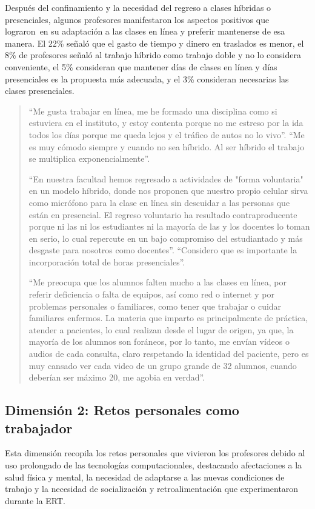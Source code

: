 \documentclass[spanish]{textolivre}
\begin{document}
Después del confinamiento y la necesidad del regreso a clases híbridas o presenciales, algunos profesores manifestaron los aspectos positivos que lograron en su adaptación a las clases en línea y preferir mantenerse de esa manera. El 22\% señaló que el gasto de tiempo y dinero en traslados es menor, el 8\% de profesores señaló al trabajo híbrido como trabajo doble y no lo considera conveniente, el 5\% consideran que mantener días de clases en línea y días presenciales es la propuesta más adecuada, y el 3\% consideran necesarias las clases presenciales.
\begin{quote}
 “Me gusta trabajar en línea, me he formado una disciplina como si estuviera en el instituto, y estoy contenta porque no me estreso por la ida todos los días porque me queda lejos y el tráfico de autos no lo vivo”. “Me es muy cómodo siempre y cuando no sea híbrido. Al ser híbrido el trabajo se multiplica exponencialmente”.
 
“En nuestra facultad hemos regresado a actividades de "forma voluntaria" en un modelo híbrido, donde nos proponen que nuestro propio celular sirva como micrófono para la clase en línea sin descuidar a las personas que están en presencial. El regreso voluntario ha resultado contraproducente porque ni las ni los estudiantes ni la mayoría de las y los docentes lo toman en serio, lo cual repercute en un bajo compromiso del estudiantado y más desgaste para nosotros como docentes”. “Considero que es importante la incorporación total de horas presenciales”.

“Me preocupa que los alumnos falten mucho a las clases en línea, por referir deficiencia o falta de equipos, así como red o internet y por problemas personales o familiares, como tener que trabajar o cuidar familiares enfermos. La materia que imparto es principalmente de práctica, atender a pacientes, lo cual realizan desde el lugar de origen, ya que, la mayoría de los alumnos son foráneos, por lo tanto, me envían vídeos o audios de cada consulta, claro respetando la identidad del paciente, pero es muy cansado ver cada video de un grupo grande de 32 alumnos, cuando deberían ser máximo 20, me agobia en verdad”.
\end{quote}


\subsection{Dimensión 2: Retos personales como trabajador}
Esta dimensión recopila los retos personales que vivieron los profesores debido al uso prolongado de las tecnologías computacionales, destacando afectaciones a la salud física y mental, la necesidad de adaptarse a las nuevas condiciones de trabajo y la necesidad de socialización y retroalimentación que experimentaron durante la ERT.
\end{document}
